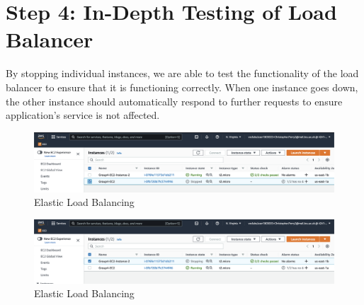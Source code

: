 \section{Step 4: In-Depth Testing of Load Balancer}

By stopping individual instances, we are able to test the functionality of the load balancer to ensure that it is functioning correctly. When one instance goes down, the other instance should automatically respond to further requests to ensure application's service is not affected.

\begin{figure}[H]
	\centering
	\includegraphics[width=\textwidth]{resources/elb/elb-test-stopped-instance.png}
	\caption{Elastic Load Balancing}
	\label{fig:elb-stopped-instance}
\end{figure}
\begin{figure}[H]
	\centering
	\includegraphics[width=\textwidth]{resources/elb/elb-test-stopped-instance-2.png}
	\caption{Elastic Load Balancing}
	\label{fig:elb-stopped-instance-2}
\end{figure}